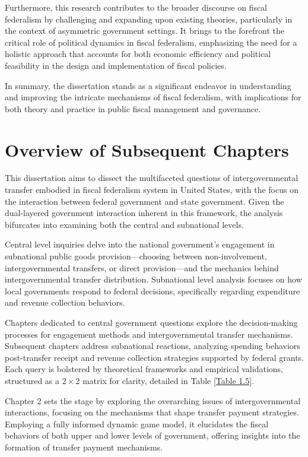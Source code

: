 Furthermore, this research contributes to the broader discourse on fiscal federalism by challenging and expanding upon existing theories, particularly in the context of asymmetric government settings. It brings to the forefront the critical role of political dynamics in fiscal federalism, emphasizing the need for a holistic approach that accounts for both economic efficiency and political feasibility in the design and implementation of fiscal policies.

In summary, the dissertation stands as a significant endeavor in understanding and improving the intricate mechanisms of fiscal federalism, with implications for both theory and practice in public fiscal management and governance.


\section{Overview of Subsequent Chapters}

This dissertation aims to dissect the multifaceted questions of intergovernmental transfer embodied in fiscal federalism system in United States, with the focus on the interaction between federal government and state government. Given the dual-layered government interaction inherent in this framework, the analysis bifurcates into examining both the central and subnational levels.

Central level inquiries delve into the national government's engagement in subnational public goods provision—choosing between non-involvement, intergovernmental transfers, or direct provision—and the mechanics behind intergovernmental transfer distribution. Subnational level analysis focuses on how local governments respond to federal decisions, specifically regarding expenditure and revenue collection behaviors.

Chapters dedicated to central government questions explore the decision-making processes for engagement methods and intergovernmental transfer mechanisms. Subsequent chapters address subnational reactions, analyzing spending behaviors post-transfer receipt and revenue collection strategies supported by federal grants. Each query is bolstered by theoretical frameworks and empirical validations, structured as a $2\times2$ matrix for clarity, detailed in Table \ref*{Table 1.5}.

Chapter 2 sets the stage by exploring the overarching issues of intergovernmental interactions, focusing on the mechanisms that shape transfer payment strategies. Employing a fully informed dynamic game model, it elucidates the fiscal behaviors of both upper and lower levels of government, offering insights into the formation of transfer payment mechanisms.

